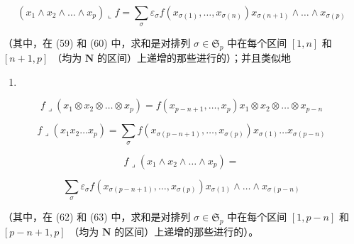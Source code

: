 \[
\left(x _ {1} \wedge x _ {2} \wedge \dots \wedge x _ {p}\right) \llcorner f = \sum_ {\sigma} \varepsilon_ {\sigma} f \left(x _ {\sigma (1)}, \dots , x _ {\sigma (n)}\right) x _ {\sigma (n + 1)} \wedge \dots \wedge x _ {\sigma (p)}
\]

（其中，在 (59) 和 (60) 中，求和是对排列 \(\sigma \in \mathfrak{S}_p\) 中在每个区间 \([1, n]\) 和 \([n + 1, p]\) （均为 \(\mathbf{N}\) 的区间）上递增的那些进行的）；并且类似地

\begin{enumerate}
\def\labelenumi{(\arabic{enumi})}
\setcounter{enumi}{60}
\tightlist
\item
\end{enumerate}

\[
f \lrcorner (x _ {1} \otimes x _ {2} \otimes \dots \otimes x _ {p}) = f (x _ {p - n + 1}, \dots , x _ {p}) x _ {1} \otimes x _ {2} \otimes \dots \otimes x _ {p - n}\tag{62}
\]

\[
f \lrcorner (x _ {1} x _ {2} \dots x _ {p}) = \sum_ {\sigma} f (x _ {\sigma (p - n + 1)}, \dots , x _ {\sigma (p)}) x _ {\sigma (1)} \dots x _ {\sigma (p - n)}\tag{63}
\]

\[
f \lrcorner (x _ {1} \wedge x _ {2} \wedge \dots \wedge x _ {p}) =
\]

\[
\sum_ {\sigma} \varepsilon_ {\sigma} f (x _ {\sigma (p - n + 1)}, \dots , x _ {\sigma (p)}) x _ {\sigma (1)} \wedge \dots \wedge x _ {\sigma (p - n)}
\]

（其中，在 (62) 和 (63) 中，求和是对排列 \(\sigma \in \mathfrak{S}_p\) 中在每个区间 \([1, p - n]\) 和 \([p - n + 1, p]\) （均为 \(\mathbf{N}\) 的区间）上递增的那些进行的）。


